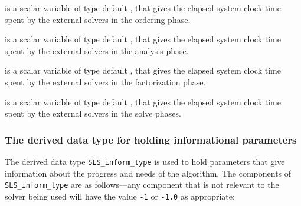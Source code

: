 \documentclass{galahad}
\newcommand{\packagename}{SLS}
\begin{document}
\begin{description}
 is a scalar variable of type default \realdp,
that gives  the elapsed system clock time spent by the external solvers in the
ordering phase.

 is a scalar variable of type default \realdp,
that gives the elapsed system clock time spent by the external solvers in the
analysis phase.

 is a scalar variable of type default \realdp,
that gives the elapsed system clock time spent by the external solvers in the
factorization phase.

 is a scalar variable of type default \realdp,
that gives  the elapsed system clock time spent by the external solvers in the
solve phases.

\end{description}


\subsubsection{The derived data type for holding informational
 parameters}\label{typeinform}
The derived data type
{\tt \packagename\_inform\_type}
is used to hold parameters that give information about the progress and needs
of the algorithm. The components of
{\tt \packagename\_inform\_type}
are as follows---any component that is not relevant to the solver being used
will have the value {\tt -1} or {\tt -1.0} as appropriate:
\end{document}
